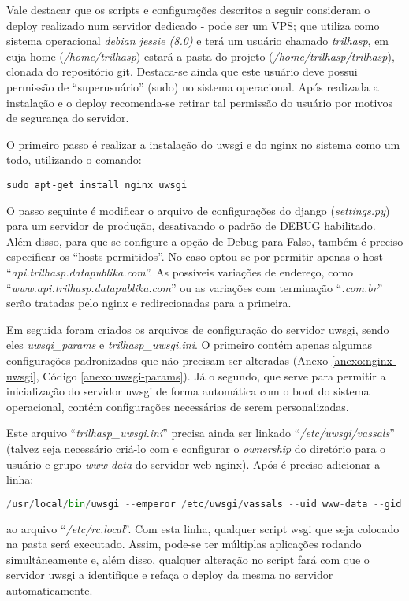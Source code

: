 Vale destacar que os scripts e configurações descritos a seguir consideram o deploy realizado num servidor dedicado - pode ser um VPS; que utiliza como sistema operacional \textit{debian jessie (8.0)} e terá um usuário chamado \textit{trilhasp}, em cuja home (\textit{/home/trilhasp}) estará a pasta do projeto (\textit{/home/trilhasp/trilhasp}), clonada do repositório git. Destaca-se ainda que este usuário deve possui permissão de ``superusuário'' (sudo) no sistema operacional. Após realizada a instalação e o deploy recomenda-se retirar tal permissão do usuário por motivos de segurança do servidor.

O primeiro passo é realizar a instalação do \gls{uwsgi} e do \gls{nginx} no sistema como um todo, utilizando o comando:
\begin{lstlisting}[caption={Instalando NGINX e uWSGI no sistema}]
sudo apt-get install nginx uwsgi
\end{lstlisting}

O passo seguinte é modificar o arquivo de configurações do \gls{django} (\textit{settings.py}) para um servidor de produção, desativando o padrão de DEBUG habilitado. Além disso, para que se configure a opção de Debug para Falso, também é preciso especificar os ``hosts permitidos''. No caso optou-se por permitir apenas o host ``\textit{api.trilhasp.datapublika.com}''. As possíveis variações de endereço, como ``\textit{www.api.trilhasp.datapublika.com}'' ou as variações com terminação ``\textit{.com.br}'' serão tratadas pelo \gls{nginx} e redirecionadas para a primeira.


Em seguida foram criados os arquivos de configuração do servidor \gls{uwsgi}, sendo eles \textit{uwsgi\_params} e \textit{trilhasp\_uwsgi.ini}.
O primeiro contém apenas algumas configurações padronizadas que não precisam ser alteradas (Anexo \ref{anexo:nginx-uwsgi}, Código \ref{anexo:uwsgi-params}). Já o segundo, que serve para permitir a inicialização do servidor \gls{uwsgi} de forma automática com o boot do sistema operacional, contém configurações necessárias de serem personalizadas.


Este arquivo ``\textit{trilhasp\_uwsgi.ini}''  precisa ainda ser linkado ``\textit{/etc/uwsgi/vassals}'' (talvez seja necessário criá-lo com e configurar o \textit{ownership} do diretório para o usuário e grupo \textit{www-data} do servidor web \gls{nginx}). Após é preciso adicionar a linha:
\begin{lstlisting}[language={Python},caption={Inicialização automática do servidor uWSGI}]
/usr/local/bin/uwsgi --emperor /etc/uwsgi/vassals --uid www-data --gid www-data
\end{lstlisting}
ao arquivo ``\textit{/etc/rc.local}''. Com esta linha, qualquer script wsgi que seja colocado na pasta será executado. Assim, pode-se ter múltiplas aplicações rodando simultâneamente e, além disso, qualquer alteração no script fará com que o servidor \gls{uwsgi} a identifique e refaça o deploy da mesma no servidor automaticamente.

